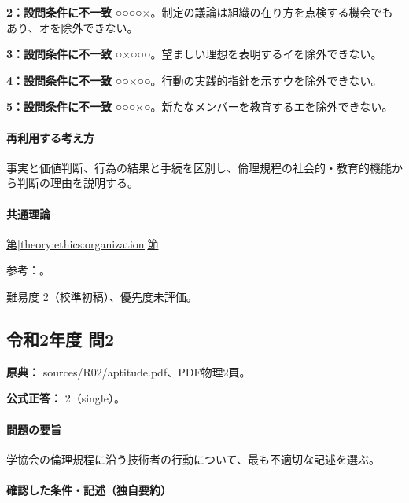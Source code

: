 \noindent\textbf{2：設問条件に不一致} ○○○○×。制定の議論は組織の在り方を点検する機会でもあり、オを除外できない。\par

\noindent\textbf{3：設問条件に不一致} ○×○○○。望ましい理想を表明するイを除外できない。\par

\noindent\textbf{4：設問条件に不一致} ○○×○○。行動の実践的指針を示すウを除外できない。\par

\noindent\textbf{5：設問条件に不一致} ○○○×○。新たなメンバーを教育するエを除外できない。\par

\paragraph{再利用する考え方} 事実と価値判断、行為の結果と手続を区別し、倫理規程の社会的・教育的機能から判断の理由を説明する。

\paragraph{共通理論} \hyperref[theory:ethics:organization]{第\ref*{theory:ethics:organization}節}

\par 参考：\cite{fudano_ethics2021}。

\par 難易度 2（校準初稿）、優先度未評価。

\subsection{令和2年度 問2}
\label{q:r02-reg-apt-02}

\noindent\textbf{原典：} sources/R02/aptitude.pdf、PDF物理2頁。

\textbf{公式正答：} 2（single）。

\paragraph{問題の要旨} 学協会の倫理規程に沿う技術者の行動について、最も不適切な記述を選ぶ。

\paragraph{確認した条件・記述（独自要約）}\mbox{}\par

